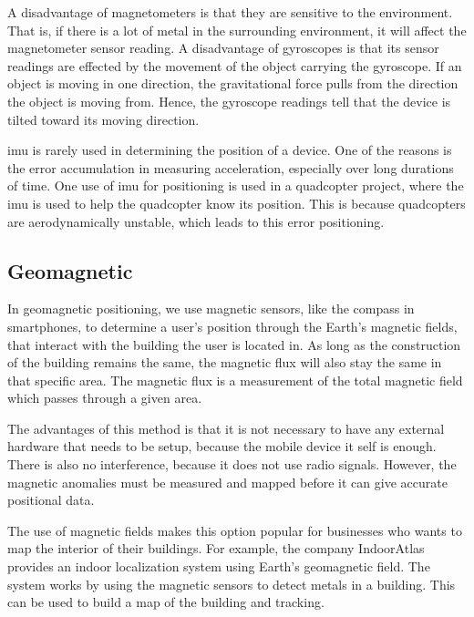 A disadvantage of magnetometers is that they are sensitive to the environment. That is, if there is a lot of metal in the surrounding environment, it will affect the magnetometer sensor reading.\cite{MagnetometerAdvDisadv} %
A disadvantage of gyroscopes is that its sensor readings are effected by the movement of the object carrying the gyroscope. If an object is moving in one direction, the gravitational force pulls from the direction the object is moving from. Hence, the gyroscope readings tell that the device is tilted toward its moving direction.\cite{Gyroscope}

\gls{imu} is rarely used in determining the position of a device. One of the reasons is the error accumulation in measuring acceleration, especially over long durations of time. One use of \gls{imu} for positioning is used in a quadcopter project, where the \gls{imu} is used to help the quadcopter know its position. This is because quadcopters are aerodynamically unstable, which leads to this error positioning.\cite{IMUQuadcopter}

\subsection{Geomagnetic}
In geomagnetic positioning, we use magnetic sensors, like the compass in smartphones, to determine a user's position through the Earth's magnetic fields, that interact with the building the user is located in\cite{IPSMapsPeople}. As long as the construction of the building remains the same, the magnetic flux will also stay the same in that specific area. The magnetic flux is a measurement of the total magnetic field which passes through a given area. \cite{magneticflux}

The advantages of this method is that it is not necessary to have any external hardware that needs to be setup, because the mobile device it self is enough. There is also no interference, because it does not use radio signals. However, the magnetic anomalies must be measured and mapped before it can give accurate positional data. \cite{magneticperformance}

The use of magnetic fields makes this option popular for businesses who wants to map the interior of their buildings. \cite{magneticperformance} For example, the company IndoorAtlas provides an indoor localization system using Earth's geomagnetic field. The system works by using the magnetic sensors to detect metals in a building. This can be used to build a map of the building and tracking.\cite{IndoorAtlas}

